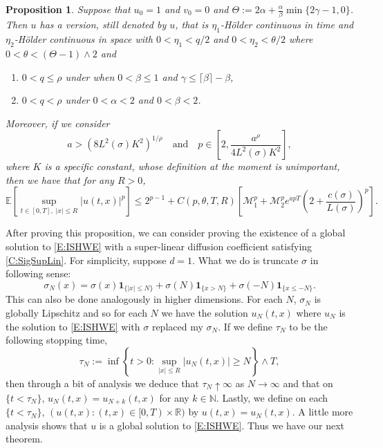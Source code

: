 \documentclass[a4paper,11pt]{article}
\numberwithin{equation}{section}
\theoremstyle{plain}
\newtheorem{proposition}[theorem]{Proposition}
\theoremstyle{definition}
\newcommand{\R}{\mathbb{R}}
\numberwithin{NQ}{section}
\numberwithin{LQ}{section}
\numberwithin{ZQ}{section}
\begin{document}
	\begin{proposition}
	\label{P:Holder}
	Suppose that $u_0=1$ and $v_0=0$ and $\Theta:= 2\alpha + \frac{\alpha}{\beta}\min\{2\gamma -1, 0\}$. Then $u$ has a version, still denoted by $u$, that is $\eta_1$-H\"older continuous in time and $\eta_2$-H\"older continuous in space with $0<\eta_1 < q/2$ and $0<\eta_2 < \theta/2$ where $0< \theta < (\Theta -1) \wedge 2$ and
	\begin{enumerate}
		\item $0< q \le \rho$ under when $0<\beta \le 1$ and $\gamma \le \lceil \beta \rceil - \beta$,
		\item $0 < q < \rho$ under $0<\alpha <2$ and $0 < \beta <2$.
	\end{enumerate}
	Moreover, if we consider
	\[
	a > \left( 8 L^2(\sigma)K^2\right)^{1/\rho} \quad \text{and} \quad 	p \in \left[ 2, \frac{a^{\rho}}{4L^2(\sigma)K^2} \right],
	\]
	where $K$ is a specific constant, whose definition at the moment is unimportant, then we have that for any $R >0$, 
	\[
	\mathbb{E}\left[ \sup_{t\in[0,T],\; |x| \le R} |u(t,x)|^p \right] \le 2^{p-1} + C(p, \theta, T,R) \left[ \mathcal{M}_1^p + \mathcal{M}_2^p e^{apT} \left(2 +  \frac{c(\sigma)}{L(\sigma)}\right)^p\right].
	\]
\end{proposition}

After proving this proposition, we can consider proving the existence of a global solution to \eqref{E:ISHWE} with a super-linear diffusion coefficient satisfying \eqref{C:SigSupLin}. For simplicity, suppose $d=1$. What we do is truncate $\sigma$ in following sense:
	\[
		\sigma_N(x) = \sigma(x)\textbf{1}_{\{|x| \le N\}} + \sigma(N)\textbf{1}_{\{x  >N\}} + \sigma(-N)\textbf{1}_{\{x \le -N\}}.
	\]
This can also be done analogously in higher dimensions. For each $N$, $\sigma_N$ is globally Lipschitz and so for each $N$ we have the solution $u_N(t,x)$ where $u_N$ is the solution to \eqref{E:ISHWE} with $\sigma$ replaced my $\sigma_N$. If we define $\tau_N$ to be the following stopping time,
	\begin{equation}
		\tau_N := \inf \left\{ t>0 : \sup_{|x| \le R} |u_N(t,x)| \ge N \right\} \wedge T,
	\end{equation}
then through a bit of analysis we deduce that $\tau_N \uparrow \infty$ as $N \to \infty$ and that on $\{t < \tau_N\}$, $u_N(t,x) = u_{N+k}(t,x)$ for any $k \in \mathbb{N}$. Lastly, we define on each $\{ t < \tau_N \}$, $(u(t,x) : (t,x) \in [0,T) \times \R)$ by $u(t,x) = u_N(t,x)$. A little more analysis shows that $u$ is a global solution to \eqref{E:ISHWE}. Thus we have our next theorem. 
\end{document}

